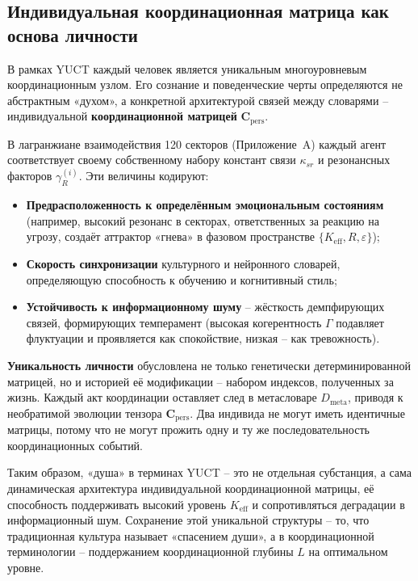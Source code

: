 \documentclass[12pt,a4paper]{article}
\begin{document}
	\subsection{Индивидуальная координационная матрица как основа личности}
	\label{subsec:personality-matrix}
	
	В рамках YUCT каждый человек является уникальным многоуровневым координационным узлом. Его сознание и поведенческие черты определяются не абстрактным «духом», а конкретной архитектурой связей между словарями – индивидуальной \textbf{координационной матрицей} $\mathbf{C}_{\text{pers}}$.
	
	В лагранжиане взаимодействия 120 секторов (Приложение~A) каждый агент соответствует своему собственному набору констант связи $\kappa_{sr}$ и резонансных факторов $\gamma_{R}^{(i)}$. Эти величины кодируют:
	\begin{itemize}
		\item \textbf{Предрасположенность к определённым эмоциональным состояниям} (например, высокий резонанс в секторах, ответственных за реакцию на угрозу, создаёт аттрактор «гнева» в фазовом пространстве $\{K_{\mathrm{eff}}, R, \varepsilon\}$);
		\item \textbf{Скорость синхронизации} культурного и нейронного словарей, определяющую способность к обучению и когнитивный стиль;
		\item \textbf{Устойчивость к информационному шуму} – жёсткость демпфирующих связей, формирующих темперамент (высокая когерентность $\Gamma$ подавляет флуктуации и проявляется как спокойствие, низкая – как тревожность).
	\end{itemize}
	
	\textbf{Уникальность личности} обусловлена не только генетически детерминированной матрицей, но и историей её модификации – набором индексов, полученных за жизнь. Каждый акт координации оставляет след в метасловаре $D_{\text{meta}}$, приводя к необратимой эволюции тензора $\mathbf{C}_{\text{pers}}$. Два индивида не могут иметь идентичные матрицы, потому что не могут прожить одну и ту же последовательность координационных событий.
	
	Таким образом, «душа» в терминах YUCT – это не отдельная субстанция, а сама динамическая архитектура индивидуальной координационной матрицы, её способность поддерживать высокий уровень $K_{\mathrm{eff}}$ и сопротивляться деградации в информационный шум. Сохранение этой уникальной структуры – то, что традиционная культура называет «спасением души», а в координационной терминологии – поддержанием координационной глубины $L$ на оптимальном уровне.
	
\end{document}
